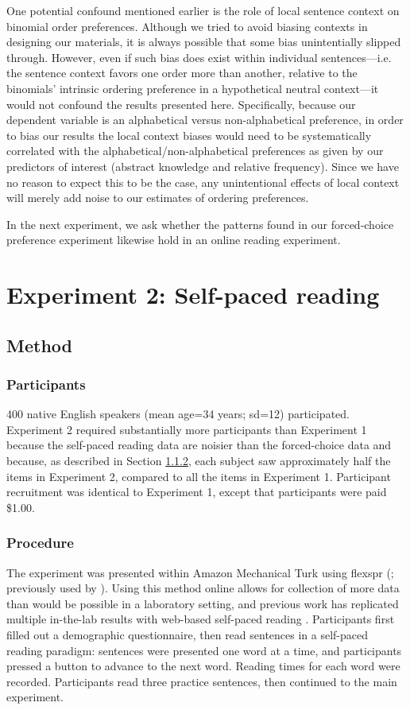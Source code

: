 \documentclass[authoryear]{elsarticle}
\begin{document}
One potential confound mentioned earlier is the role of local sentence context on binomial order preferences. Although we tried to avoid biasing contexts in designing our materials, it is always possible that some bias unintentially slipped through. However, even if such bias does exist within individual sentences---i.e. the sentence context favors one order more than another, relative to the binomials' intrinsic ordering preference in a hypothetical neutral context---it would not confound the results presented here. Specifically, because our dependent variable is an alphabetical versus non-alphabetical preference, in order to bias our results the local context biases would need to be systematically correlated with the alphabetical/non-alphabetical preferences as given by our predictors of interest (abstract knowledge and relative frequency). Since we have no reason to expect this to be the case, any unintentional effects of local context will merely add noise to our estimates of ordering preferences.

In the next experiment, we ask whether the patterns found in our forced-choice preference experiment likewise hold in an online reading experiment.


\section{Experiment 2: Self-paced reading}\label{expt2}
\subsection{Method}
\subsubsection{Participants}
400 native English speakers (mean age=34 years; sd=12) participated. Experiment 2 required substantially more participants than Experiment 1 because the self-paced reading data are noisier than the forced-choice data and because, as described in Section \ref{expt2-procedure}, each subject saw approximately half the items in Experiment 2, compared to all the items in Experiment 1. Participant recruitment was identical to Experiment 1, except that participants were paid \$1.00.

\subsubsection{Procedure}\label{expt2-procedure}
The experiment was presented within Amazon Mechanical Turk using flexspr (\citealp{flexspr:cFpvxjkw}; previously used by \citealp{Bergen:2012ur,Linzen:2015jb,Singh:2015uf}). Using this method online allows for collection of more data than would be possible in a laboratory setting, and previous work has replicated multiple in-the-lab results with web-based self-paced reading \citep{Enochson:2015dy}. Participants first filled out a demographic questionnaire, then read sentences in a self-paced reading paradigm: sentences were presented one word at a time, and participants pressed a button to advance to the next word. Reading times for each word were recorded. Participants read three practice sentences, then continued to the main experiment.
\end{document}
